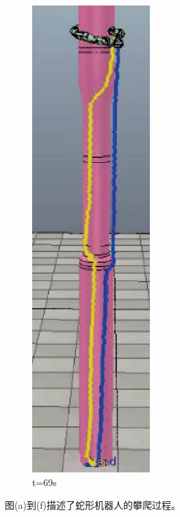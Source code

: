 \begin{figure}[htbp]
	\begin{subfigure}{0.3\textwidth}{
			\centering
			\includegraphics[height=0.18\textheight,width=0.5\textwidth]{figure/chap05/BSB/1m35s.eps}
			\caption{t=69s}
		}
	\end{subfigure}
	
	\caption{图(a)到(f)描述了蛇形机器人的攀爬过程。}
	\label{fig:BSB}
\end{figure}
